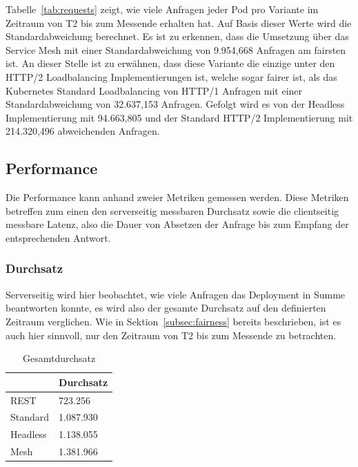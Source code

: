 Tabelle~\ref{tab:requests} zeigt, wie viele Anfragen jeder Pod pro Variante im Zeitraum von T2 bis zum Messende erhalten hat.
Auf Basis dieser Werte wird die Standardabweichung berechnet.
Es ist zu erkennen, dass die Umsetzung über das Service Mesh mit einer Standardabweichung von 9.954,668 Anfragen am fairsten ist.
An dieser Stelle ist zu erwähnen, dass diese Variante die einzige unter den HTTP/2 Loadbalancing Implementierungen ist, welche sogar fairer ist, als das Kubernetes Standard Loadbalancing von HTTP/1 Anfragen mit einer Standardabweichung von 32.637,153 Anfragen.
Gefolgt wird es von der Headless Implementierung mit 94.663,805 und der Standard HTTP/2 Implementierung mit 214.320,496 abweichenden Anfragen.

\subsection{Performance}\label{subsec:performance}

Die Performance kann anhand zweier Metriken gemessen werden.
Diese Metriken betreffen zum einen den serverseitig messbaren Durchsatz sowie die clientseitig messbare Latenz, also die Dauer von Absetzen der Anfrage bis zum Empfang der entsprechenden Antwort.

\subsubsection{Durchsatz}

Serverseitig wird hier beobachtet, wie viele Anfragen das Deployment in Summe beantworten konnte, es wird also der gesamte Durchsatz auf den definierten Zeitraum verglichen.
Wie in Sektion~\ref{subsec:fairness} bereits beschrieben, ist es auch hier sinnvoll, nur den Zeitraum von T2 bis zum Messende zu betrachten.

\begin{table}[H]
    \centering
    \begin{tabular}{|l|l|}
        \hline
        & Durchsatz \\ \hline
        REST     & 723.256    \\ \hline
        Standard & 1.087.930   \\ \hline
        Headless & 1.138.055   \\ \hline
        Mesh     & 1.381.966   \\ \hline
    \end{tabular}
    \caption{Gesamtdurchsatz}
    \label{tab:durchsatz}
\end{table}

